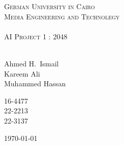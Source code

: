 \begin{titlepage}
\begin{center}
\textsc{\large German University in Cairo}\\[0.4cm]
\textsc{\large Media Engineering and Technolegy}\\[0.4cm]
\HRule \\[0.4cm]
\textsc{\Large AI Project 1 : 2048}\\[0.4cm]

\HRule \\[1.5cm]

\noindent
\begin{minipage}{0.4\textwidth}
\begin{flushleft} \large
Ahmed H.~Ismail \\
Kareem Ali \\
Muhammed Hassan \\
\end{flushleft}
\end{minipage}
\begin{minipage}{0.4\textwidth}
\begin{flushright} \large
16-4477 \\
22-2213 \\
22-3137 \\
\end{flushright}
\end{minipage} 

\vfill

{\large \today}


\end{center}
\end{titlepage}